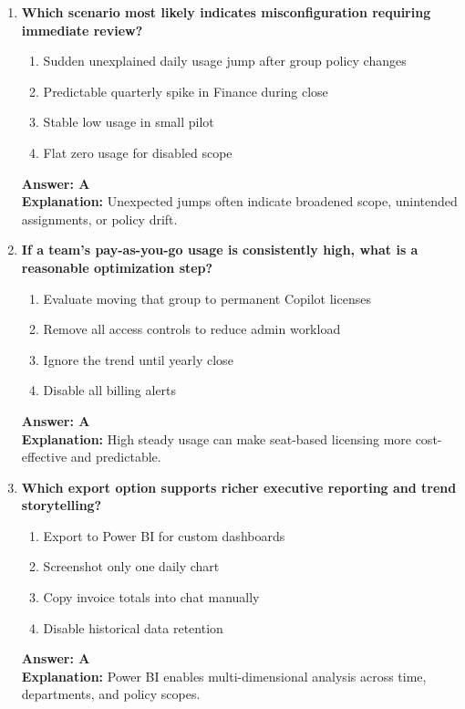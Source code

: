 \documentclass[10pt]{article}
\begin{document}
\begin{enumerate}[leftmargin=*]
\item \textbf{Which scenario most likely indicates misconfiguration requiring immediate review?}
\begin{enumerate}[label=\Alph*.]
  \item Sudden unexplained daily usage jump after group policy changes
  \item Predictable quarterly spike in Finance during close
  \item Stable low usage in small pilot
  \item Flat zero usage for disabled scope
\end{enumerate}
\textbf{Answer: A}\\
\textbf{Explanation:} Unexpected jumps often indicate broadened scope, unintended assignments, or policy drift.

\item \textbf{If a team’s pay-as-you-go usage is consistently high, what is a reasonable optimization step?}
\begin{enumerate}[label=\Alph*.]
  \item Evaluate moving that group to permanent Copilot licenses
  \item Remove all access controls to reduce admin workload
  \item Ignore the trend until yearly close
  \item Disable all billing alerts
\end{enumerate}
\textbf{Answer: A}\\
\textbf{Explanation:} High steady usage can make seat-based licensing more cost-effective and predictable.

\item \textbf{Which export option supports richer executive reporting and trend storytelling?}
\begin{enumerate}[label=\Alph*.]
  \item Export to Power BI for custom dashboards
  \item Screenshot only one daily chart
  \item Copy invoice totals into chat manually
  \item Disable historical data retention
\end{enumerate}
\textbf{Answer: A}\\
\textbf{Explanation:} Power BI enables multi-dimensional analysis across time, departments, and policy scopes.


\end{enumerate}
\end{document}

